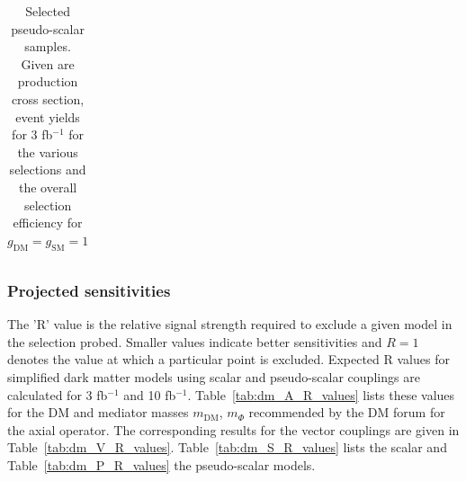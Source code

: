 \begin{table}[h!]
\begin{tabular}{lllllll}
\hline
\end{tabular}
\caption{Selected pseudo-scalar samples. Given are production cross section, event yields for 3 fb$^{-1 }$ for the various selections and the overall selection efficiency for $g_\textrm{DM}=g_\textrm{SM}=1$}
\label{tab:dm_P_g1_3fb}
\end{table}



\subsubsection{Projected sensitivities}

The 'R' value is the relative signal strength required to exclude a given model in the selection probed. Smaller values indicate better sensitivities and $R=1$ denotes the value at which a particular point is excluded. Expected R values for simplified dark matter models using scalar and pseudo-scalar couplings are calculated for 3 fb$^{-1 }$ and 10 fb$^{-1 }$. Table~\ref{tab:dm_A_R_values} lists these
values for the DM and mediator masses $m_\textrm{DM}$, $m_\Phi$ recommended by the DM forum for the axial operator. The corresponding results for the vector couplings are given in Table~\ref{tab:dm_V_R_values}. Table~\ref{tab:dm_S_R_values} lists the scalar and Table~\ref{tab:dm_P_R_values} the pseudo-scalar models.



